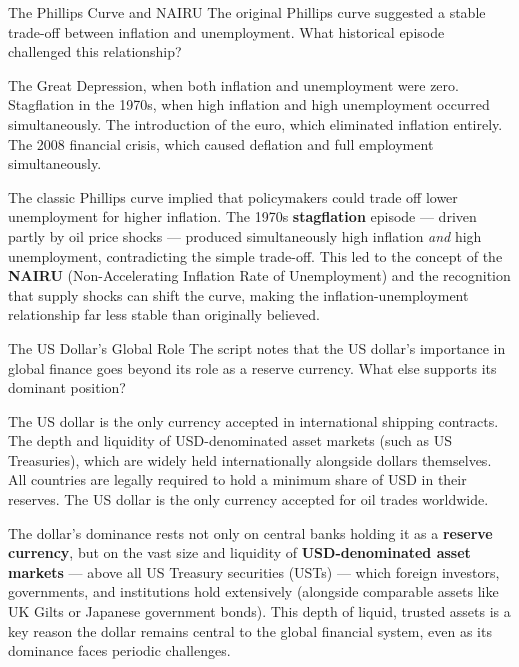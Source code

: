 \begin{question}[type=mc]{The Phillips Curve and NAIRU}
The original Phillips curve suggested a stable trade-off between inflation
and unemployment. What historical episode challenged this relationship?
\begin{choices}
  \choice        The Great Depression, when both inflation and unemployment
                 were zero.
  \correctchoice Stagflation in the 1970s, when high inflation and high
                 unemployment occurred simultaneously.
  \choice        The introduction of the euro, which eliminated inflation
                 entirely.
  \choice        The 2008 financial crisis, which caused deflation and full
                 employment simultaneously.
\end{choices}
\begin{solution}
  The classic Phillips curve implied that policymakers could trade off lower
  unemployment for higher inflation. The 1970s \textbf{stagflation}
  episode --- driven partly by oil price shocks --- produced simultaneously
  high inflation \emph{and} high unemployment, contradicting the simple
  trade-off. This led to the concept of the \textbf{NAIRU} (Non-Accelerating
  Inflation Rate of Unemployment) and the recognition that supply shocks can
  shift the curve, making the inflation-unemployment relationship far less
  stable than originally believed.
\end{solution}
\end{question}

\begin{question}[type=mc]{The US Dollar's Global Role}
The script notes that the US dollar's importance in global finance goes
beyond its role as a reserve currency. What else supports its dominant
position?
\begin{choices}
  \choice        The US dollar is the only currency accepted in
                 international shipping contracts.
  \correctchoice The depth and liquidity of USD-denominated asset markets
                 (such as US Treasuries), which are widely held internationally
                 alongside dollars themselves.
  \choice        All countries are legally required to hold a minimum share
                 of USD in their reserves.
  \choice        The US dollar is the only currency accepted for oil trades
                 worldwide.
\end{choices}
\begin{solution}
  The dollar's dominance rests not only on central banks holding it as a
  \textbf{reserve currency}, but on the vast size and liquidity of
  \textbf{USD-denominated asset markets} --- above all US Treasury
  securities (USTs) --- which foreign investors, governments, and
  institutions hold extensively (alongside comparable assets like UK Gilts
  or Japanese government bonds). This depth of liquid, trusted assets is a
  key reason the dollar remains central to the global financial system, even
  as its dominance faces periodic challenges.
\end{solution}
\end{question}


